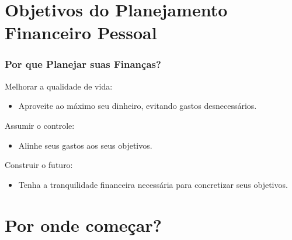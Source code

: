 \section{Objetivos do Planejamento Financeiro Pessoal}


\begin{frame}[t]\frametitle{Por que Planejar suas Finanças?}

  \vspace{1cm}\pause

  \begin{block}{\Large \textcolor{green}{}\quad Melhorar a qualidade de vida:}
    \begin{itemize}
      \item Aproveite ao máximo seu dinheiro, evitando gastos desnecessários.
    \end{itemize}
  \end{block}

  \vspace{0.7cm}\pause

  \begin{block}{\Large \textcolor{blue}{}\quad Assumir o controle:}
    \begin{itemize}
      \item Alinhe seus gastos aos seus objetivos.
    \end{itemize}
  \end{block}

  \vspace{0.7cm}\pause

  \begin{block}{\Large \textcolor{red}{}\quad Construir o futuro:}
    \begin{itemize}
      \item Tenha a tranquilidade financeira necessária para concretizar seus objetivos.
    \end{itemize}
  \end{block}

\end{frame}

\section{Por onde começar?}

